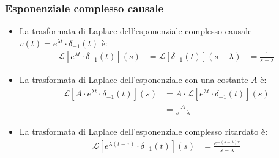 \documentclass[a4paper]{article}
\begin{document}
\subsubsection{Esponenziale complesso causale}
\begin{figure}[H]
  \centering
\end{figure}
\begin{itemize}
  \item La trasformata di Laplace dell'esponenziale complesso causale
    \( v(t) = e^{\lambda t} \cdot \delta_{-1}(t) \) è:
    \[
      \begin{aligned}
        \mathcal{L}[e^{\lambda t} \cdot \delta_{-1}(t)](s) &= \mathcal{L}[\delta_{-1}(t)](s-\lambda)
                                                           &= \frac{1}{s-\lambda}
      \end{aligned}
    \] 
  \item La trasformata di Laplace dell'esponenziale con una costante \( A \) è:
    \[
      \begin{aligned}
        \mathcal{L}\left[A \cdot e^{\lambda t} \cdot \delta_{-1}(t)\right](s) &= A \cdot \mathcal{L}[e^{\lambda t} \cdot \delta_{-1}(t)](s)\\
                                                                 &= \frac{A}{s-\lambda}
      \end{aligned}
    \]
  \item La trasformata di Laplace dell'esponenziale complesso ritardato è:
    \[
      \begin{aligned}
        \mathcal{L}\left[e^{\lambda (t - \tau)} \cdot \delta_{-1}(t)\right](s) &= \frac{e^{-(s -\lambda) \tau}}{s-\lambda}
      \end{aligned}
    \]
\end{itemize}
\end{document}
